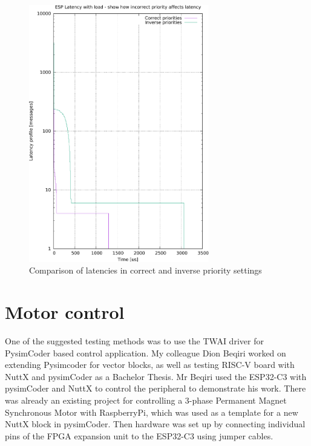 \documentclass{ctuthesis}
\begin{document}
 \begin{figure}[htb]
 \includegraphics[width=0.7\textwidth]{images/compare_priorities.pdf}
 \caption{Comparison of latencies in correct and inverse priority settings}
 \end{figure}
 
 \section{Motor control}
 One of the suggested testing methods was to use the TWAI driver for PysimCoder based control application. My colleague Dion Beqiri worked on extending Pysimcoder for vector blocks, as well as testing RISC-V board with NuttX and pysimCoder as a Bachelor Thesis\cite{thesis-beqiri}. Mr Beqiri used the ESP32-C3 with pysimCoder and NuttX to control the peripheral to demonstrate his work. There was already an existing project for controlling a 3-phase Permanent Magnet Synchronous Motor with RaspberryPi, which was used as a template for a new NuttX block in pysimCoder. Then hardware was set up by connecting individual pins of the FPGA expansion unit to the ESP32-C3 using jumper cables.
  
\end{document}
